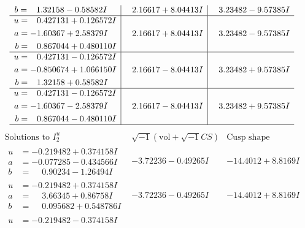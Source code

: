 \documentclass[1p]{elsarticle_modified}
\theoremstyle{definition}
\newcommand{\I}{\sqrt{-1}}
\begin{document}
$$\begin{array}{c|c|c}
\begin{aligned}
b &= \phantom{-}1.32158 - 0.58582 I\end{aligned}
 & \phantom{-}2.16617 + 8.04413 I & \phantom{-}3.23482 - 9.57385 I \\ \hline\begin{aligned}
u &= \phantom{-}0.427131 + 0.126572 I \\
a &= -1.60367 + 2.58379 I \\
b &= \phantom{-}0.867044 + 0.480110 I\end{aligned}
 & \phantom{-}2.16617 + 8.04413 I & \phantom{-}3.23482 - 9.57385 I \\ \hline\begin{aligned}
u &= \phantom{-}0.427131 - 0.126572 I \\
a &= -0.850674 + 1.066150 I \\
b &= \phantom{-}1.32158 + 0.58582 I\end{aligned}
 & \phantom{-}2.16617 - 8.04413 I & \phantom{-}3.23482 + 9.57385 I \\ \hline\begin{aligned}
u &= \phantom{-}0.427131 - 0.126572 I \\
a &= -1.60367 - 2.58379 I \\
b &= \phantom{-}0.867044 - 0.480110 I\end{aligned}
 & \phantom{-}2.16617 - 8.04413 I & \phantom{-}3.23482 + 9.57385 I\\
 \hline 
 \end{array}$$\newpage$$\begin{array}{c|c|c}  
\text{Solutions to }I^u_{2}& \I (\text{vol} + \sqrt{-1}CS) & \text{Cusp shape}\\
 \hline 
\begin{aligned}
u &= -0.219482 + 0.374158 I \\
a &= -0.077285 - 0.434566 I \\
b &= \phantom{-}0.90234 - 1.26494 I\end{aligned}
 & -3.72236 - 0.49265 I & -14.4012 + 8.8169 I \\ \hline\begin{aligned}
u &= -0.219482 + 0.374158 I \\
a &= \phantom{-}3.66345 + 0.86758 I \\
b &= \phantom{-}0.095682 + 0.548786 I\end{aligned}
 & -3.72236 - 0.49265 I & -14.4012 + 8.8169 I \\ \hline\begin{aligned}
u &= -0.219482 - 0.374158 I \\

\end{aligned}
\end{array}$$
\end{document}
